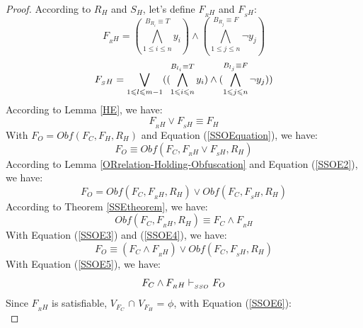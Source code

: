 \documentclass[conference,compsocconf]{IEEEtran}
\begin{document}
\begin{proof}
        According to $R_H$ and $S_H$, let's define $F_{_RH}$ and $F_{_SH}$:
        \begin{equation}\label{SSORH}
        F_{_RH}=
        (\bigwedge_{1\leqslant i\leqslant n}^{B_{R_i}\equiv T}y_i)\wedge 
        (\bigwedge_{1\leqslant j\leqslant n}^{B_{R_j}\equiv F}\neg y_j)
        \end{equation}
        \begin{equation}\label{SSOSH}
         F_{_SH}=\bigvee_{1\leqslant l\leqslant m-1}(
        (\bigwedge_{1\leqslant i\leqslant n}^{B_{l_i}\equiv T}y_i)\wedge
        (\bigwedge_{1\leqslant j\leqslant n}^{B_{l_j}\equiv F}\neg y_j))   \\ 
	  \end{equation}        
According to Lemma \ref{HE}, we have:\\
        \begin{equation}\label{SSOEquation}
        F_{_RH}\vee F_{_SH}\equiv F_H
        \end{equation}        
With $F_O=Obf(F_C,F_H,R_H)$ and Equation (\ref{SSOEquation}), we have:\\  
        \begin{equation}\label{SSOE2}
	F_O \equiv Obf(F_C,F_{_RH}\vee F_{_SH},R_H)
        \end{equation}
According to Lemma \ref{ORrelation-Holding-Obfuscation} and Equation (\ref{SSOE2}), we have:\\
        \begin{equation}\label{SSOE3}
	  F_O=Obf(F_C,F_{_RH},R_H) \vee Obf(F_C,F_{_SH},R_H)
	\end{equation}
According to Theorem \ref{SSEtheorem}, we have:\\
	\begin{equation}\label{SSOE4}
	  Obf(F_C,F_{_RH},R_H)\equiv F_C\wedge F_{_RH}
        \end{equation}
With Equation (\ref{SSOE3}) and (\ref{SSOE4}), we have:\\
        \begin{equation}\label{SSOE5}
	  F_O \equiv (F_C\wedge F_{_RH}) \vee Obf(F_C,F_{_SH},R_H)
	\end{equation}
With Equation (\ref{SSOE5}), we have:\\
	 \begin{equation}\label{SSOE6}
	  F_C \wedge F_{_RH}\vdash_{_{SSO}} F_{O} \\
	\end{equation}
Since $F_{_RH}$ is satisfiable, $V_{F_C}$ $\cap$ $V_{F_H}$ = $\phi$, with Equation (\ref{SSOE6}):\\	

\end{proof}
\end{document}
